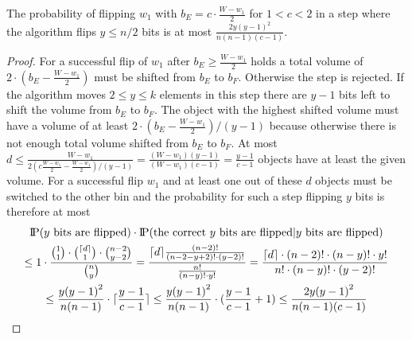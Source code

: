 \begin{lemma}\label{lemma:W1FlipWontHappen}
    The probability of flipping $w_1$ with $b_E = c\cdot\frac{W-w_1}{2}$ for $1<c<2$ in a step where the algorithm flips $y\le n/2$ bits is at most \(\frac{2y{(y-1)}^2}{n(n-1)(c-1)}\).
\end{lemma}
\begin{proof}
    For a successful flip of $w_1$ after $b_E \ge \frac{W-w_1}{2}$ holds a total volume of $2\cdot(b_E-\frac{W-w_1}{2})$ must be shifted from $b_E$ to $b_F$.
    Otherwise the step is rejected.
    If the algorithm moves $2\le y\le k$ elements in this step there are $y-1$ bits left to shift the volume from $b_E$ to $b_F$.
    The object with the highest shifted volume must have a volume of at least $2\cdot(b_E-\frac{W-w_1}{2})/(y-1)$ because otherwise there is not enough total volume shifted from $b_E$ to $b_F$.
    At most \(d\le\frac{W-w_1}{2(c\frac{W-w_1}{2}-\frac{W-w_1}{2})/(y-1)}=\frac{(W-w_1)(y-1)}{(W-w_1)(c-1)}=\frac{y-1}{c-1}\) objects have at least the given volume.
    For a successful flip $w_1$ and at least one out of these $d$ objects must be switched to the other bin and the probability for such a step flipping $y$ bits is therefore at most
    \begin{gather}
        \nonumber \text{I\kern-0.15em P}(y \text{ bits are flipped})\cdot\text{I\kern-0.15em P}(\text{the correct $y$ bits are flipped} | y \text{ bits are flipped})\\ \nonumber
        \le 1\cdot \frac{\binom{1}{1}\cdot\binom{\lceil d\rceil}{1}\cdot\binom{n-2}{y-2}}{\binom{n}{y}}
        =\frac{\lceil d\rceil\frac{(n-2)!}{(n-2-y+2)!\cdot (y-2)!}}{\frac{n!}{(n-y)!\cdot y!}}
        =\frac{\lceil d\rceil\cdot(n-2)!\cdot(n-y)!\cdot y!}{n!\cdot(n-y)!\cdot(y-2)!}\\ \nonumber
        \le \frac{y{(y-1)}^2}{n(n-1)}\cdot\lceil\frac{y-1}{c-1}\rceil
        \le \frac{y{(y-1)}^2}{n(n-1)}\cdot(\frac{y-1}{c-1}+1)
        \le \frac{2y{(y-1)}^2}{n(n-1)(c-1)}
    \end{gather}
\end{proof}

